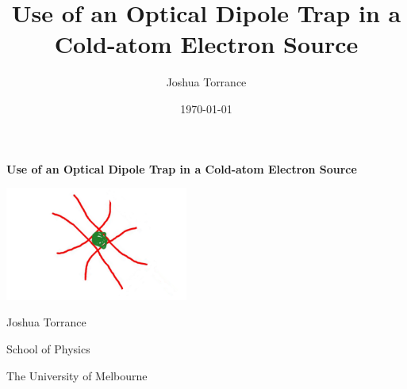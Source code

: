 \documentclass[12pt]{book}
\title{Use of an Optical Dipole Trap in a Cold-atom Electron Source}
\author{Joshua Torrance}
\date{\today}
\begin{document}


    \renewcommand{\footnotesize}{\small}
    \renewcommand{\footnoterule}{\relax}
    \thispagestyle{empty}
    \begin{center}
        { \Huge {\bfseries {Use of an Optical Dipole Trap in a Cold-atom Electron Source}} \par}
    {\large \vspace*{35mm} {{\includegraphics[width=6cm]{figs/crosseddipoletrap1.png}} \par} \vspace*{25mm}}
        {{\vspace*{30mm} \Large {Joshua Torrance}} \par} 
    {\large 
	    \vspace*{1ex}
        {{School of Physics} \par}
	    \vspace*{1ex}
        {{The University of Melbourne} \par}
	    \vspace*{25mm}
    }%
    \end{center}
    \null\vfill

\tableofcontents
{}

\renewcommand{\chaptername}{} %



%




\printglossaries
\newpage

{}

\end{document}
